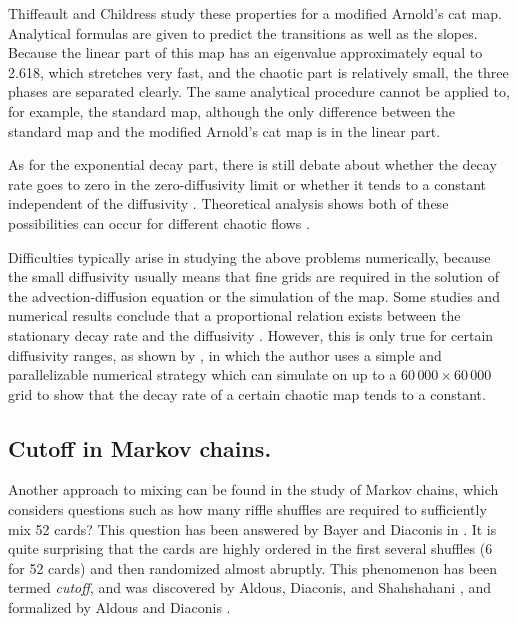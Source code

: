 \documentclass{aims}
\theoremstyle{definition}
\begin{document}
Thiffeault and Childress \cite{Thiffeault2003-13} study these
properties for a modified Arnold's cat map. Analytical formulas are
given to predict the transitions as well as the slopes. Because the
linear part of this map has an eigenvalue approximately equal to
2.618, which stretches very fast, and the chaotic part is relatively
small, the three phases are separated clearly. The same analytical
procedure cannot be applied to, for example, the standard map,
although the only difference between the standard map and the modified
Arnold's cat map is in the linear part.

As for the exponential decay part, there is still debate about whether
the decay rate goes to zero in the zero-diffusivity limit or whether
it tends to a constant independent of the diffusivity
\cite{Thiffeault2004, Tsang2005}. Theoretical analysis shows both of
these possibilities can occur for different chaotic flows
\cite{Haynes2005}.

Difficulties typically arise in studying the above problems
numerically, because the small diffusivity usually means that fine
grids are required in the solution of the advection-diffusion equation
or the simulation of the map. Some studies and numerical results
conclude that a proportional relation exists between the stationary
decay rate and the diffusivity \cite{Cerbelli2003,
  Pikovsky2003}. However, this is only true for certain diffusivity
ranges, as shown by \cite{Tsang2005}, in which the author uses a
simple and parallelizable numerical strategy which can simulate on up
to a $60\,000 \times 60\,000$ grid to show that the decay rate of a
certain chaotic map tends to a constant.

\subsection{Cutoff in Markov chains.}
Another approach to mixing can be found in the study of Markov chains,
which considers questions such as how many riffle shuffles are
required to sufficiently mix 52 cards?  This question has been
answered by Bayer and Diaconis in \cite{Diaconis1992}. It is quite
surprising that the cards are highly ordered in the first several
shuffles (6 for 52 cards) and then randomized almost abruptly. This
phenomenon has been termed \emph{cutoff}, and was discovered by
Aldous, Diaconis, and Shahshahani \cite{Diaconis1987, Diaconis1986,
  Diaconis1981}, and formalized by Aldous and Diaconis
\cite{Diaconis1996, Diaconis1987}.
\end{document}
